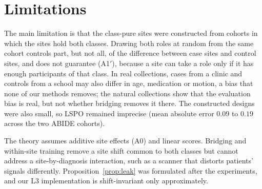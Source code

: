 \section{Limitations}\label{sec:limitations}

The main limitation is that the class-pure sites were constructed from cohorts in which the sites hold both classes. Drawing both roles at random from the same cohort controls part, but not all, of the difference between case sites and control sites, and does not guarantee (A1$'$), because a site can take a role only if it has enough participants of that class. In real collections, cases from a clinic and controls from a school may also differ in age, medication or motion, a bias that none of our methods removes; the natural collections show that the evaluation bias is real, but not whether bridging removes it there. The constructed designs were also small, so LSPO remained imprecise (mean absolute error $0.09$ to $0.19$ across the two ABIDE cohorts).

The theory assumes additive site effects (A0) and linear scores. Bridging and within-site training remove a site shift common to both classes but cannot address a site-by-diagnosis interaction, such as a scanner that distorts patients' signals differently. Proposition~\ref{prop:leak} was formulated after the experiments, and our L3 implementation is shift-invariant only approximately.
